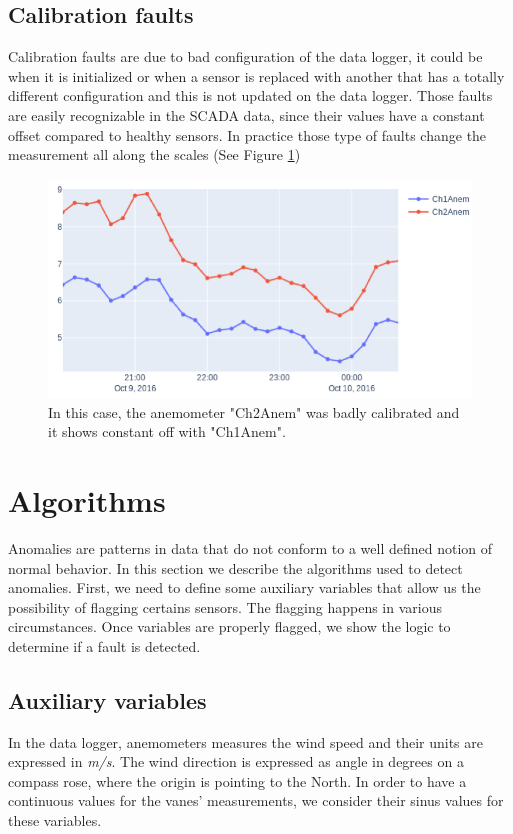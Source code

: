 \documentclass[journal]{IEEEtran}
\begin{document}
\subsection{Calibration faults} 
Calibration faults are due to bad configuration of the data logger, it could be when it is initialized or when a sensor is replaced with another that has a totally different configuration and this is not updated on the data logger. Those faults are easily recognizable in the SCADA data, since their values have a constant offset compared to healthy sensors. In practice those type of faults change the measurement all along the scales (See Figure \ref{fig:calibrationFaults})
\begin{figure}[h]
	\centering
	\includegraphics[width=\columnwidth]{Images/CalibrationFaults.png}
	\caption{In this case, the anemometer "Ch2Anem" was badly calibrated and it shows constant off with "Ch1Anem".}
	\label{fig:calibrationFaults}
\end{figure}

\section{Algorithms}\label{sec:algorithms}
Anomalies are patterns in data that do not conform to a well defined notion of normal behavior. In this section we describe the algorithms used to detect anomalies. First, we need to define some auxiliary variables that allow us the possibility of flagging certains sensors. The flagging happens in various circumstances. Once variables are properly flagged, we show the logic to determine if a fault is detected.  
\subsection{Auxiliary variables}\label{subsec:computedvariables}
In the data logger, anemometers measures the wind speed and their units are expressed in \emph{m/s}. The wind direction is expressed as angle in degrees on a compass rose, where the origin is pointing to the North. In order to have a continuous values for the vanes' measurements, we consider their sinus values for these variables.
\end{document}
